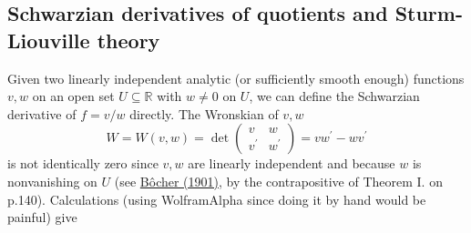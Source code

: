 \documentclass[11pt,leqno]{article}
\theoremstyle{plain}
\theoremstyle{definition}
\numberwithin{equation}{section}
\numberwithin{lem}{section}
\newcommand{\bbC}{\mathbb C}
\begin{document}



\subsection{Schwarzian derivatives of quotients and Sturm-Liouville theory}
Given two linearly independent analytic (or sufficiently smooth enough) functions $v,w$ on an open set $U\subseteq \mathbb R$ with $w\neq 0$ on $U$, we can define the Schwarzian derivative of $f = v/w$ directly. The Wronskian of $v,w$
\[W = W(v,w) = \det\begin{pmatrix}
    v & w \\ v^\prime & w^\prime
\end{pmatrix} = vw^\prime - wv^\prime\]
is not identically zero since $v,w$ are linearly independent and because $w$ is nonvanishing on $U$ (see \href{https://www.ams.org/journals/tran/1901-002-02/S0002-9947-1901-1500560-5/S0002-9947-1901-1500560-5.pdf}{B\^ocher (1901)}, by the contrapositive of Theorem I. on p.140). Calculations (using WolframAlpha since doing it by hand would be painful) give
\end{document}
